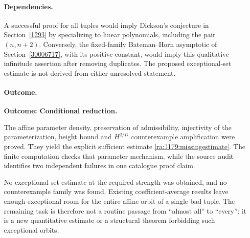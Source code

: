 \documentclass[11pt]{article}
\begin{document}
\paragraph{Dependencies.}
A successful proof for all tuples would imply Dickson's conjecture in
Section~\ref{1293} by specializing to linear polynomials, including the
pair $(n,n+2)$. Conversely, the fixed-family Bateman--Horn asymptotic of
Section~\ref{30006717}, with its positive constant, would imply this qualitative
infinitude assertion after removing duplicates. The proposed
exceptional-set estimate is not derived from either unresolved statement.

\paragraph{Outcome.}
\textbf{Outcome: Conditional reduction.}

The affine parameter density, preservation of admissibility, injectivity
of the parameterization, height bound and $H^{2/D}$ counterexample
amplification were proved. They yield the explicit sufficient estimate
\eqref{ra:1179:missingestimate}. The finite computation checks that
parameter mechanism, while the source audit identifies two independent
failures in one catalogue proof claim.

No exceptional-set estimate at the required strength was obtained, and
no counterexample family was found. Existing coefficient-average results
leave enough exceptional room for the entire affine orbit of a single
bad tuple. The remaining task is therefore not a routine passage from
``almost all'' to ``every'': it is a new quantitative estimate or a
structural theorem forbidding such exceptional orbits.
\end{document}
